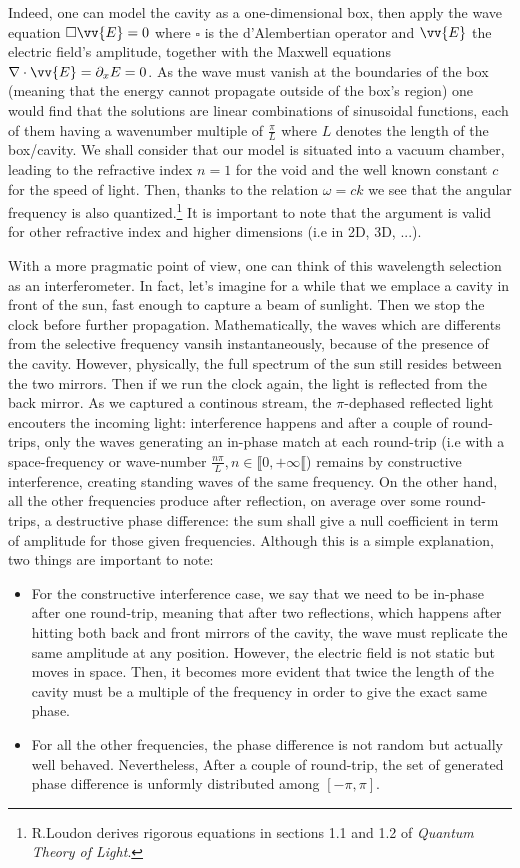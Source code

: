 \documentclass[12pt]{report}
\begin{document}
Indeed, one can model the cavity as a one-dimensional box, then apply the wave equation $ \square \vv{E} = 0$ where $\square$ is the d'Alembertian operator and $\vv{E}$ the electric field's amplitude, together with the Maxwell equations $\nabla \cdot \vv{E} = \partial _x E = 0$. As the wave must vanish at the boundaries of the box (meaning that the energy cannot propagate outside of the box's region) one would find that the solutions are linear combinations of sinusoidal functions, each of them having a wavenumber multiple of $\frac{\pi}{L}$ where $L$ denotes the length of the box/cavity. We shall consider that our model is situated into a vacuum chamber, leading to the refractive index $n=1$ for the void and the well known constant $ c$ for the speed of light. Then, thanks to the relation $\omega = ck$ we see that the angular frequency is also quantized.\footnote{R.Loudon derives rigorous equations in sections 1.1 and 1.2 of \textit{Quantum Theory of Light}.} It is important to note that the argument is valid for other refractive index and higher dimensions (i.e in 2D, 3D, ...).

With a more pragmatic point of view, one can think of this wavelength selection as an interferometer. In fact, let's imagine for a while that we emplace a cavity in front of the sun, fast enough to capture a beam of sunlight. Then we stop the clock before further propagation. Mathematically, the waves which are differents from the selective frequency vansih instantaneously, because of the presence of the cavity. However, physically, the full spectrum of the sun still resides between the two mirrors. Then if we run the clock again, the light is reflected from the back mirror. As we captured a continous stream, the $\pi$-dephased reflected light encouters the incoming light: interference happens and after a couple of round-trips, only the waves generating an in-phase match at each round-trip (i.e with a space-frequency or wave-number $\frac{n\pi}{L}, n\in \llbracket 0, +\infty \llbracket $) remains by constructive interference, creating standing waves of the same frequency. On the other hand, all the other frequencies produce after reflection, on average over some round-trips, a destructive phase difference: the sum shall give a null coefficient in term of amplitude for those given frequencies. Although this is a simple explanation, two things are important to note:
\begin{itemize}
  \item For the constructive interference case, we say that we need to be in-phase after one round-trip, meaning that after two reflections, which happens after hitting both back and front mirrors of the cavity, the wave must replicate the same amplitude at any position. However, the electric field is not static but moves in space. Then, it becomes more evident that twice the length of the cavity must be a multiple of the frequency in order to give the exact same phase.
  \item  For all the other frequencies, the phase difference is not random but actually well behaved. Nevertheless, After a couple of round-trip, the set of generated phase difference is unformly distributed among $ \left[ -\pi, \pi \right] $.
\end{itemize}
\end{document}

